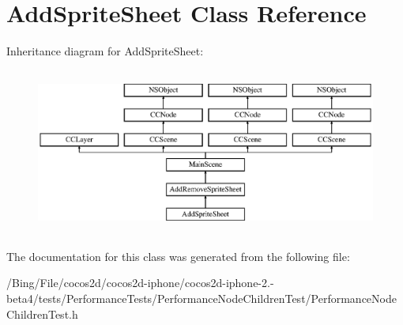 \hypertarget{interface_add_sprite_sheet}{\section{Add\-Sprite\-Sheet Class Reference}
\label{interface_add_sprite_sheet}
}
Inheritance diagram for Add\-Sprite\-Sheet\-:\begin{figure}[H]
\begin{center}
\leavevmode
\includegraphics[height=5.490196cm]{interface_add_sprite_sheet}
\end{center}
\end{figure}


The documentation for this class was generated from the following file\-:\begin{DoxyCompactItemize}
\item 
/\-Bing/\-File/cocos2d/cocos2d-\/iphone/cocos2d-\/iphone-\/2.-\/beta4/tests/\-Performance\-Tests/\-Performance\-Node\-Children\-Test/Performance\-Node\-Children\-Test.\-h\end{DoxyCompactItemize}
